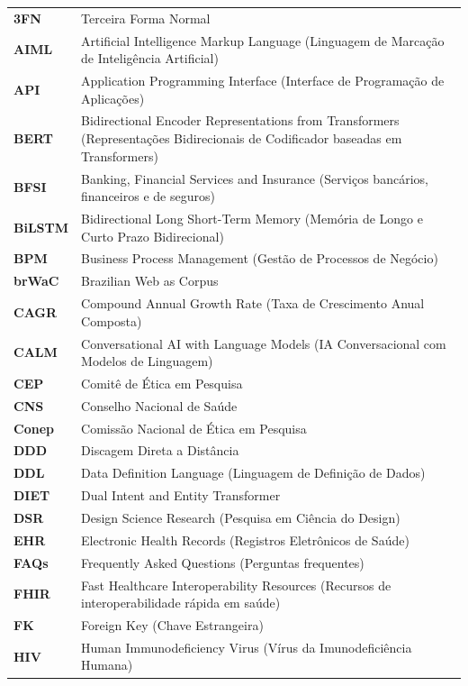 \documentclass[12pt,a4paper]{extarticle}
\begin{document}
\begin{xltabular}{\textwidth}{@{}p{1.6cm}Y@{}}
\textbf{3FN} & Terceira Forma Normal \\
\textbf{AIML} & Artificial Intelligence Markup Language (Linguagem de Marcação de Inteligência Artificial) \\
\textbf{API} & Application Programming Interface (Interface de Programação de Aplicações) \\
\textbf{BERT} & Bidirectional Encoder Representations from Transformers (Representações Bidirecionais de Codificador baseadas em Transformers) \\
\textbf{BFSI} & Banking, Financial Services and Insurance (Serviços bancários, financeiros e de seguros) \\
\textbf{BiLSTM} & Bidirectional Long Short-Term Memory (Memória de Longo e Curto Prazo Bidirecional) \\
\textbf{BPM} & Business Process Management (Gestão de Processos de Negócio) \\
\textbf{brWaC} & Brazilian Web as Corpus \\
\textbf{CAGR} & Compound Annual Growth Rate (Taxa de Crescimento Anual Composta) \\
\textbf{CALM} & Conversational AI with Language Models (IA Conversacional com Modelos de Linguagem) \\
\textbf{CEP} & Comitê de Ética em Pesquisa \\
\textbf{CNS} & Conselho Nacional de Saúde \\
\textbf{Conep} & Comissão Nacional de Ética em Pesquisa \\
\textbf{DDD} & Discagem Direta a Distância \\
\textbf{DDL} & Data Definition Language (Linguagem de Definição de Dados) \\
\textbf{DIET} & Dual Intent and Entity Transformer \\
\textbf{DSR} & Design Science Research (Pesquisa em Ciência do Design) \\
\textbf{EHR} & Electronic Health Records (Registros Eletrônicos de Saúde) \\
\textbf{FAQs} & Frequently Asked Questions (Perguntas frequentes) \\
\textbf{FHIR} & Fast Healthcare Interoperability Resources (Recursos de interoperabilidade rápida em saúde) \\
\textbf{FK} & Foreign Key (Chave Estrangeira) \\
\textbf{HIV} & Human Immunodeficiency Virus (Vírus da Imunodeficiência Humana) \\

\end{xltabular}
\end{document}
